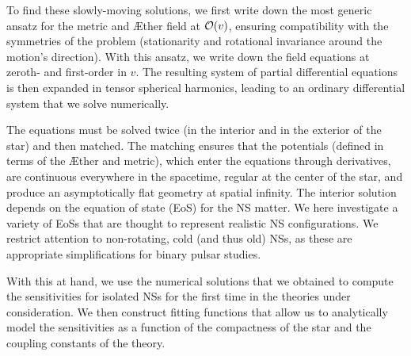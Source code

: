 \documentclass[prd,aps,twocolumn,nofootinbib,showpacs,superscriptaddress]{revtex4-1}
\begin{document}
To find these slowly-moving solutions, we first write down the most generic ansatz for the metric and \AE ther field at ${\cal O}(v)$, ensuring compatibility with the symmetries of
the problem (stationarity and rotational invariance around the motion's direction). With this ansatz, we write down the field equations at zeroth- and first-order in $v$. The resulting system of partial differential
equations is then expanded in tensor spherical harmonics, leading to an ordinary differential system that we solve numerically.  

The equations must be solved twice (in the interior and in the
exterior of the star) and then matched. The matching ensures that the 
potentials (defined in terms of the \AE ther and metric), which enter the equations 
through derivatives, are continuous everywhere in the spacetime, regular at the center 
of the star, and  produce an asymptotically flat geometry at spatial infinity. The interior
solution depends on the equation of state (EoS) for the NS matter. We here investigate
a variety of EoSs that are thought to represent realistic NS
configurations. We restrict attention to non-rotating, cold (and thus old) NSs, 
as these are appropriate simplifications for binary pulsar studies.

With this at hand, we use the numerical solutions that we obtained to compute the 
sensitivities for isolated NSs for the first time in the theories under consideration. 
We then construct fitting functions that allow us to
analytically model the sensitivities as a function of the compactness 
of the star and the coupling constants of the theory. 
\end{document}
